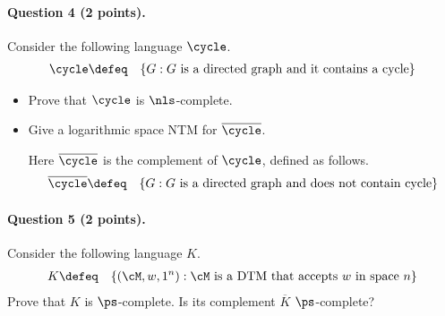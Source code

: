 \documentclass[11pt, a4paper]{article}
\begin{document}
\paragraph*{Question 4 (2 points).}
Consider the following language $\cycle$.
\begin{eqnarray*}
\cycle & \defeq & \{G : G \ \text{is a directed graph and it contains a cycle}\}
\end{eqnarray*}
\begin{itemize}
\item
Prove that $\cycle$ is $\nls$-complete.
\item 
Give a logarithmic space NTM for $\overline{\cycle}$.

Here $\overline{\cycle}$ is the complement of $\cycle$, defined as follows.
\begin{eqnarray*}
\overline{\cycle} & \defeq & \{G : G \ \text{is a directed graph and does not contain cycle}\}
\end{eqnarray*}
\end{itemize}

\paragraph*{Question 5 (2 points).}
Consider the following language $K$.
\begin{eqnarray*}
K & \defeq & \{ (\cM,w,1^n) : \cM \ \text{is a DTM that accepts}\ w \ \text{in space}\ n\}
\end{eqnarray*}
Prove that $K$ is $\ps$-complete.
Is its complement $\overline{K}$ $\ps$-complete?
\end{document}
